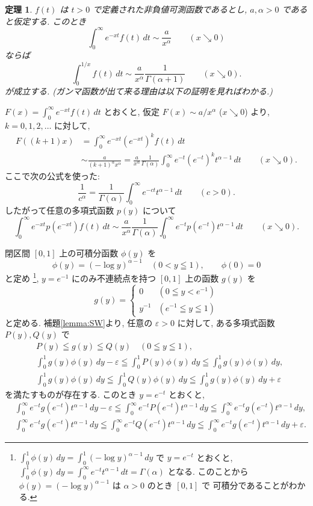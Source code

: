 \documentclass[12pt,twoside]{jarticle}
\makeatletter
\newcommand\eps{\varepsilon}
\theoremstyle{jplain}
\newtheorem{theorem}{定理}
\theoremstyle{jplain}
\theoremstyle{jplain}
\numberwithin{theorem}{section}
\numberwithin{equation}{section}
\numberwithin{figure}{section}
\numberwithin{table}{section}
\newcommand\lemmaref[1]{補題\ref{#1}}
\renewenvironment{proof}[1][\proofname]{\par
  \normalfont
  \topsep6\p@\@plus6\p@ \trivlist
  \item[\hskip\labelsep{\bfseries #1}\@addpunct{\bfseries.}]\ignorespaces
}{%
  \endtrivlist
}
\renewcommand{\proofname}{証明}
\makeatother
\begin{document}
\begin{theorem}
\label{theorem:Tauber-Laplace}
$f(t)$ は $t>0$ で定義された非負値可測函数であるとし,
$a,\alpha>0$ であると仮定する. このとき
\[
\int_0^\infty e^{-xt}f(t)\,dt \sim \frac{a}{x^\alpha}
\qquad (x\searrow 0)
\]
ならば
\[
\int_0^{1/x} f(t)\,dt \sim \frac{a}{x^\alpha}\frac{1}{\Gamma(\alpha+1)}
\qquad (x\searrow 0).
\]
が成立する.  (ガンマ函数が出て来る理由は以下の証明を見ればわかる.)
\end{theorem}

\begin{proof}
$F(x)=\int_0^\infty e^{-xt}f(t)\,dt$ とおくと,
仮定 $F(x)\sim a/x^\alpha$ ($x\searrow 0$) より, $k=0,1,2,\ldots$ に対して,
\begin{align*}
F((k+1)x)&=
\int_0^\infty e^{-xt}\left(e^{-xt}\right)^k f(t)\,dt
\\ &
\sim \frac{a}{(k+1)^\alpha x^\alpha}
=\frac{a}{x^\alpha}\frac{1}{\Gamma(\alpha)}
\int_0^\infty e^{-t}\left(e^{-t}\right)^k t^{\alpha-1}\,dt
\qquad(x\searrow 0).
\end{align*}
ここで次の公式を使った:
\[
\frac{1}{c^\alpha} = \frac{1}{\Gamma(\alpha)}\int_0^\infty e^{-ct} t^{\alpha-1}\,dt
\qquad (c>0).
\]
したがって任意の多項式函数 $p(y)$ について
\[
\int_0^\infty e^{-xt}p(e^{-xt})f(t)\,dt
\sim
\frac{a}{x^\alpha}\frac{1}{\Gamma(\alpha)}\int_0^\infty e^{-t}p(e^{-t})t^{\alpha-1}\,dt
\qquad(x\searrow 0).
\]

閉区間 $[0,1]$ 上の可積分函数 $\phi(y)$ を
\[
\phi(y)=(-\log y)^{\alpha-1}\quad (0<y\leqq 1), \qquad
\phi(0)=0
\]
と定め%
\footnote{$\int_0^1\phi(y)\,dy=\int_0^1(-\log y)^{\alpha-1}\,dy$
で $y=e^{-t}$ とおくと,
$\int_0^1\phi(y)\,dy=\int_0^\infty e^{-t} t^{\alpha-1}\,dt=\Gamma(\alpha)$
となる. このことから $\phi(y)=(-\log y)^{\alpha-1}$ は $\alpha>0$ のとき $[0,1]$ で
可積分であることがわかる.
}, %
$y=e^{-1}$ にのみ不連続点を持つ $[0,1]$ 上の函数 $g(y)$ を
\[
g(y) =
\begin{cases}
0      & (0\leqq y<e^{-1}) \\
y^{-1} & (e^{-1}\leqq y\leqq 1)
\end{cases}
\]
と定める.
\lemmaref{lemma:SW}より, 任意の $\eps>0$ に対して,
ある多項式函数 $P(y),Q(y)$ で
\begin{align*}
&
P(y)\leqq g(y)\leqq Q(y) \quad (0\leqq y\leqq 1),
\\ &
\int_0^1 g(y)\phi(y)\,dy-\eps
\leqq
\int_0^1 P(y)\phi(y)\,dy
\leqq
\int_0^1 g(y)\phi(y)\,dy,
\\ &
\int_0^1 g(y)\phi(y)\,dy
\leqq
\int_0^1 Q(y)\phi(y)\,dy
\leqq
\int_0^1 g(y)\phi(y)\,dy+\eps
\end{align*}
を満たすものが存在する.  このとき $y=e^{-t}$ とおくと,
\begin{align*}
&
\int_0^\infty e^{-t}g(e^{-t})t^{\alpha-1}\,dy-\eps
\leqq
\int_0^\infty e^{-t}P(e^{-t})t^{\alpha-1}\,dy
\leqq
\int_0^\infty e^{-t}g(e^{-t})t^{\alpha-1}\,dy,
\\ &
\int_0^\infty e^{-t}g(e^{-t})t^{\alpha-1}\,dy
\leqq
\int_0^\infty e^{-t}Q(e^{-t})t^{\alpha-1}\,dy
\leqq
\int_0^\infty e^{-t}g(e^{-t})t^{\alpha-1}\,dy+\eps.
\end{align*}


\end{proof}
\end{document}
